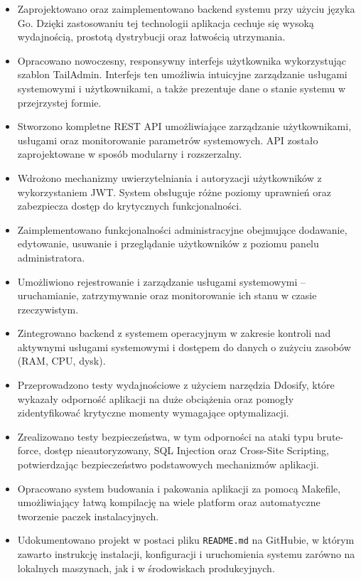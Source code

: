 \begin{itemize}
    \item Zaprojektowano oraz zaimplementowano backend systemu przy użyciu języka Go. Dzięki zastosowaniu tej technologii aplikacja cechuje się wysoką wydajnością, prostotą dystrybucji oraz łatwością utrzymania.
    \item Opracowano nowoczesny, responsywny interfejs użytkownika wykorzystując szablon TailAdmin. Interfejs ten umożliwia intuicyjne zarządzanie usługami systemowymi i użytkownikami, a także prezentuje dane o stanie systemu w przejrzystej formie.
    \item Stworzono kompletne REST API umożliwiające zarządzanie użytkownikami, usługami oraz monitorowanie parametrów systemowych. API zostało zaprojektowane w sposób modularny i rozszerzalny.
    \item Wdrożono mechanizmy uwierzytelniania i autoryzacji użytkowników z wykorzystaniem JWT. System obsługuje różne poziomy uprawnień oraz zabezpiecza dostęp do krytycznych funkcjonalności.
    \item Zaimplementowano funkcjonalności administracyjne obejmujące dodawanie, edytowanie, usuwanie i przeglądanie użytkowników z poziomu panelu administratora.
    \item Umożliwiono rejestrowanie i zarządzanie usługami systemowymi – uruchamianie, zatrzymywanie oraz monitorowanie ich stanu w czasie rzeczywistym.
    \item Zintegrowano backend z systemem operacyjnym w zakresie kontroli nad aktywnymi usługami systemowymi i dostępem do danych o zużyciu zasobów (RAM, CPU, dysk).
    \item Przeprowadzono testy wydajnościowe z użyciem narzędzia Ddosify, które wykazały odporność aplikacji na duże obciążenia oraz pomogły zidentyfikować krytyczne momenty wymagające optymalizacji.
    \item Zrealizowano testy bezpieczeństwa, w tym odporności na ataki typu brute-force, dostęp nieautoryzowany, SQL Injection oraz Cross-Site Scripting, potwierdzając bezpieczeństwo podstawowych mechanizmów aplikacji.
    \item Opracowano system budowania i pakowania aplikacji za pomocą Makefile, umożliwiający łatwą kompilację na wiele platform oraz automatyczne tworzenie paczek instalacyjnych.
    \item Udokumentowano projekt w postaci pliku \texttt{README.md} na GitHubie, w którym zawarto instrukcję instalacji, konfiguracji i uruchomienia systemu zarówno na lokalnych maszynach, jak i w środowiskach produkcyjnych.
\end{itemize}

